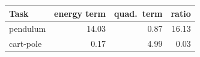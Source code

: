 \begin{tabular}{lrrr}\toprule
Task & energy term & quad.\ term & ratio \\\midrule
pendulum & 14.03 & 0.87 & 16.13 \\
cart-pole & 0.17 & 4.99 & 0.03 \\
\bottomrule
\end{tabular}
